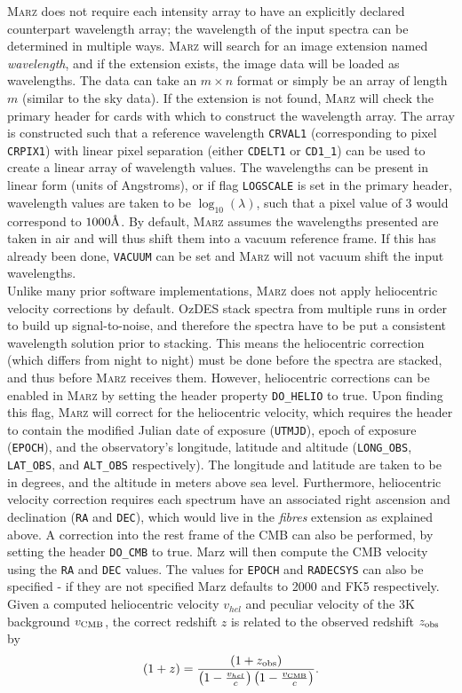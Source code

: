 \documentclass[5p]{elsarticle}
\newcommand{\marz}{\textsc{Marz}}
\newcommand{\angstrom}{\mbox{\normalfont\AA}}
\begin{document}
\marz{} does not require each intensity array to have an explicitly declared counterpart wavelength array; the wavelength of the input spectra can be determined in multiple ways. \marz{} will search for an image extension named \textit{wavelength}, and if the extension exists, the image data will be loaded as wavelengths. The data can take an $m\times n$ format or simply be an array of length $m$ (similar to the sky data). If the extension is not found, \marz{} will check the primary header for cards with which to construct the wavelength array. The array is constructed such that a reference wavelength \verb;CRVAL1; (corresponding to pixel \verb;CRPIX1;) with linear pixel separation (either \verb;CDELT1; or \verb;CD1_1;) can be used to create a linear array of wavelength values. The wavelengths can be present in linear form (units of Angstroms), or if flag \verb;LOGSCALE; is set in the primary header, wavelength values are taken to be $\log_{10}(\lambda)$, such that a pixel value of $3$ would correspond to $1000\angstrom$. By default, \marz{} assumes the wavelengths presented are taken in air and will thus shift them into a vacuum reference frame. If this has already been done, \verb;VACUUM; can be set and \marz{} will not vacuum shift the input wavelengths.\\

Unlike many prior software implementations, \marz{} does not apply heliocentric velocity corrections by default. OzDES stack spectra from multiple runs in order to build up signal-to-noise, and therefore the spectra have to be put a consistent wavelength solution prior to stacking. This means the heliocentric correction (which differs from night to night) must be done before the spectra are stacked, and thus before \marz{} receives them. However, heliocentric corrections can be enabled in \marz{} by setting the header property \verb;DO_HELIO; to true. Upon finding this flag, \marz{} will correct for the heliocentric velocity, which requires the header to contain the modified Julian date of exposure (\verb;UTMJD;), epoch of exposure (\verb;EPOCH;), and the observatory's longitude, latitude and altitude (\verb;LONG_OBS;, \verb;LAT_OBS;, and \verb;ALT_OBS; respectively). The longitude and latitude are taken to be in degrees, and the altitude in meters above sea level. Furthermore, heliocentric velocity correction requires each spectrum have an associated right ascension and declination (\verb;RA; and \verb;DEC;), which would live in the \textit{fibres} extension as explained above. A correction into the rest frame of the CMB can also be performed, by setting the header \verb;DO_CMB; to true. Marz will then compute the CMB velocity using the \verb;RA; and \verb;DEC; values. The values for \verb;EPOCH; and \verb;RADECSYS; can also be specified - if they are not specified Marz defaults to 2000 and FK5 respectively. Given a computed heliocentric velocity $v_{hel}$ and peculiar velocity of the 3K background $v_{\rm CMB}$, the correct redshift $z$ is related to the observed redshift $z_{\rm obs}$ by
\begin{equation}
(1 + z) = \frac{(1 + z_{\rm obs})}{\left(1 - \frac{v_{hel}}{c}\right)\left(1 - \frac{v_{\rm CMB}}{c}\right)}.
\end{equation}
\end{document}
